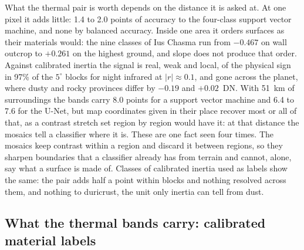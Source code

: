 \documentclass[twocolumn]{aastex701}
\begin{document}
What the thermal pair is worth depends on the distance it is asked at. At one pixel it adds little: 1.4 to 2.0
points of accuracy to the four-class support vector machine, and none by balanced accuracy. Inside one area it
orders surfaces as their materials would: the nine classes of Ius Chasma run from $-0.467$ on wall outcrop to
$+0.261$ on the highest ground, and slope does not produce that order. Against calibrated inertia the signal is
real, weak and local, of the physical sign in 97\% of the $5^{\circ}$ blocks for night infrared at
$|r|\approx0.1$, and gone across the planet, where dusty and rocky provinces differ by $-0.19$ and $+0.02$~DN.
With 51~km of surroundings the bands carry 8.0 points for a support vector machine and 6.4 to 7.6 for the U-Net,
but map coordinates given in their place recover most or all of that, as a contrast stretch set region by region
would have it: at that distance the mosaics tell a classifier where it is. These are one fact seen four times. The
mosaics keep contrast within a region and discard it between regions, so they sharpen boundaries that a classifier
already has from terrain and cannot, alone, say what a surface is made of. Classes of calibrated inertia used as
labels show the same: the pair adds half a point within blocks and nothing resolved across them, and
nothing to duricrust, the unit only inertia can tell from dust.

\subsection{What the thermal bands carry: calibrated material labels} \label{sec:material}
\end{document}
